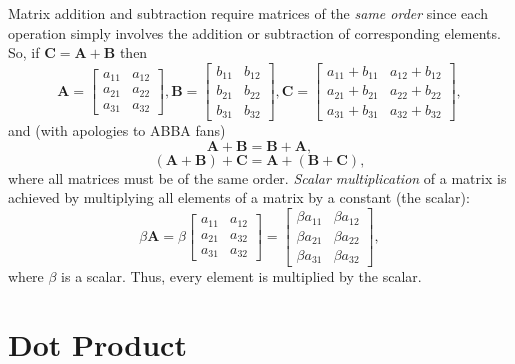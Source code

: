 	Matrix addition and subtraction require matrices of the \emph{same order} since each operation 
simply involves the addition or subtraction of corresponding elements. So, if $\mathbf{C} = \mathbf{A} + \mathbf{B}$ then
\begin{equation}
\mathbf{A} = \left[ \begin{array}{cc}
a_{11} & a_{12}\\
a_{21} & a_{22}\\
a_{31} & a_{32} \end{array} \right]	 , \mathbf{B} = 
\left[ \begin{array}{cc}
b_{11} & b_{12}\\
b_{21} & b_{22}\\
b_{31} & b_{32} \end{array} \right]	 ,
\mathbf{C} = \left[ \begin{array}{cc}
a_{11}+  b_{11} & a_{12} +  b_{12}\\
a_{21}+  b_{21} & a_{22} +  b_{22}\\
a_{31} + b_{31} & a_{32} + b_{32} \end{array} \right]	 ,
\end{equation}
and (with apologies to ABBA fans)
\begin{equation}
\mathbf{A} + \mathbf{B} = \mathbf{B} + \mathbf{A},
\end{equation}
\begin{equation}
(\mathbf{A} + \mathbf{B}) + \mathbf{C} = \mathbf{A} + (\mathbf{B} + \mathbf{C}),
\end{equation}	 
where all matrices must be of the same order. \emph{Scalar multiplication} of a matrix is achieved by multiplying all elements of a matrix 
by a constant (the scalar):
\begin{equation}
\beta \mathbf{A} = \beta \left[ \begin{array}{cc}
a_{11} & a_{12} \\
a_{21} & a_{32}\\
a_{31} & a_{32}
\end{array}
\right]
=
\left[ \begin{array}{cc}
\beta a_{11} & \beta a_{12} \\
\beta a_{21} & \beta a_{22}\\
\beta a_{31} & \beta a_{32}
\end{array}
\right],
\end{equation}	 
where $\beta$ is a scalar. 
Thus, every element is multiplied by the scalar. 

\section{Dot Product}

